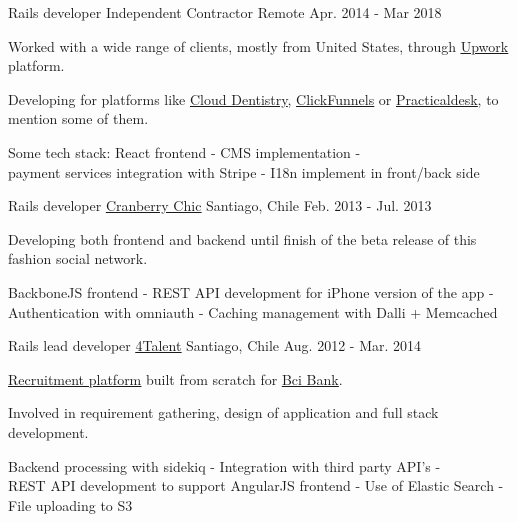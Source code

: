 \begin{cventries}
  \cventry
    {Rails developer} %
    {Independent Contractor} %
    {Remote} %
    {Apr. 2014 - Mar 2018} %
    {
      \begin{cvitems} %
        \item { Worked with a wide range of clients, mostly from United States, through
                \href{https://www.upwork.com/freelancers/~0165692cc0b947512e}{\underline{Upwork}} platform.}
        \item { Developing for platforms like
                \href{https://www.clouddentistry.com/}{\underline{Cloud Dentistry}},
                \href{https://www.clickfunnels.com/}{\underline{ClickFunnels}} or
                \href{https://practicaldesk.com/}{\underline{Practicaldesk}},
                to mention some of them.}
        \item { Some tech stack: React frontend - CMS implementation - \\
                payment services integration with Stripe - I18n implement in front/back side}
      \end{cvitems}
    }

  \cventry
    {Rails developer} %
    {\href{http://www.cranberrychic.com/}{\underline{Cranberry Chic}}} %
    {Santiago, Chile} %
    {Feb. 2013 - Jul. 2013} %
    {
      \begin{cvitems} %
        \item { Developing both frontend and backend until finish of the beta
                release of this fashion social network.}
        \item { BackboneJS frontend - REST API development for iPhone version of the app -\\
                Authentication with omniauth - Caching management with Dalli + Memcached }
      \end{cvitems}
    }

  \cventry
    {Rails lead developer} %
    {\href{http://4talent.cl/}{\underline{4Talent}}} %
    {Santiago, Chile} %
    {Aug. 2012 - Mar. 2014} %
    {
      \begin{cvitems} %
        \item { \href{http://trabajaenbci.cl/}{\underline{Recruitment platform}}
                built from scratch for \href{https://www.bci.cl/}{\underline{Bci Bank}}.}
        \item { Involved in requirement gathering, design of application and full stack development.}
        \item { Backend processing with sidekiq - Integration with third party API's -\\
                REST API development to support AngularJS frontend -
                Use of Elastic Search - File uploading to S3}
      \end{cvitems}
    }


\end{cventries}
